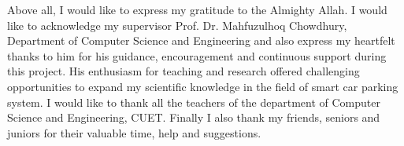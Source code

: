 \begin{acknowledgements}
Above all, I would like to express my gratitude to the Almighty Allah. I would like to acknowledge my supervisor Prof. Dr. Mahfuzulhoq Chowdhury, Department of Computer Science and Engineering and also express my heartfelt thanks to him for his guidance, encouragement and continuous support during this project. His enthusiasm for teaching and research offered challenging opportunities to expand my scientific knowledge in the field of smart car parking system. I would like to thank all the teachers of the department of Computer Science and Engineering, CUET. Finally I also thank my friends, seniors and juniors for their valuable time, help and suggestions.  
\end{acknowledgements}